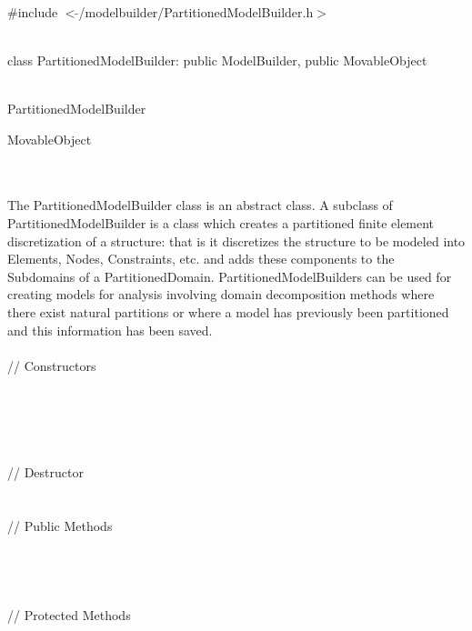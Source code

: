 
   \\
\#include $<\tilde{ }$/modelbuilder/PartitionedModelBuilder.h$>$  


  \\
class PartitionedModelBuilder: public ModelBuilder, public MovableObject  


 \\
 PartitionedModelBuilder 

 MovableObject 

\indent{} \\

 \\ 
\indent The PartitionedModelBuilder class is an abstract class. A subclass
of PartitionedModelBuilder is a class which creates a partitioned finite element
discretization of a structure: that is it discretizes the structure to
be modeled into Elements, Nodes, Constraints, etc. and adds these
components to the Subdomains of a PartitionedDomain.
PartitionedModelBuilders can be used for creating models for analysis
involving domain decomposition methods where there exist natural
partitions or where a model has previously been partitioned and this
information has been saved. \\

 \\
\indent\indent // Constructors \\ 
\indent{}\\ 
\indent{} \\ \\
\indent{}\\ \\
\indent\indent // Destructor \\ 
\indent{}\\  \\
\indent\indent // Public Methods \\ 
\indent{} \\
\indent{} \\ 
\indent{} \\ \\
\indent\indent // Protected Methods \\ 
\indent{} \\

